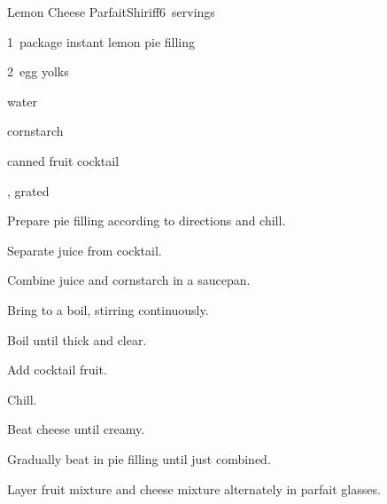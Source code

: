 \begin{recipe}{Lemon Cheese Parfait}{Shiriff}{6~servings}

\begin{ingredients}
\item 1~package instant lemon pie filling
\item 2~egg yolks
\item \C{2\half} water
\item {} cornstarch
\item {} canned fruit cocktail
\item {} , grated
\end{ingredients}

\begin{directions}
\item Prepare pie filling according to directions and chill.
\item Separate juice from cocktail.
\item Combine juice and cornstarch in a saucepan.
\item Bring to a boil, stirring continuously.
\item Boil until thick and clear.
\item Add cocktail fruit.
\item Chill.
\item Beat cheese until creamy.
\item Gradually beat in pie filling until just combined.
\item Layer fruit mixture and cheese mixture alternately in parfait glasses.
\end{directions}

\end{recipe}
